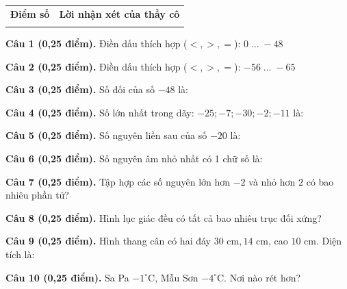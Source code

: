 \documentclass[12pt,a4paper]{article}
\begin{document}
\vspace{1.0mm}

\noindent
\begin{tabularx}{\linewidth}{|p{3.2cm}|X|}
\hline
\centering\textbf{Điểm số} & \centering\textbf{Lời nhận xét của thầy cô} \tabularnewline
\rule{0pt}{1.8cm} & \\
\hline
\end{tabularx}

\vspace{1.0mm}

\noindent\textbf{Câu 1 (0,25 điểm).} Điền dấu thích hợp ($<, >, =$): $0 \; \dots \; -48$ \shortans{$>$}\par\vspace{0.25mm}
\noindent\textbf{Câu 2 (0,25 điểm).} Điền dấu thích hợp ($<, >, =$): $-56 \; \dots \; -65$ \shortans{$>$}\par\vspace{0.25mm}
\noindent\textbf{Câu 3 (0,25 điểm).} Số đối của số $-48$ là: \par\vspace{0.25mm}
\noindent\textbf{Câu 4 (0,25 điểm).} Số lớn nhất trong dãy: $-25; -7; -30; -2; -11$ là: \par\vspace{0.25mm}
\noindent\textbf{Câu 5 (0,25 điểm).} Số nguyên liền sau của số $-20$ là: \par\vspace{0.25mm}
\noindent\textbf{Câu 6 (0,25 điểm).} Số nguyên âm nhỏ nhất có 1 chữ số là: \par\vspace{0.25mm}
\noindent\textbf{Câu 7 (0,25 điểm).} Tập hợp các số nguyên lớn hơn $-2$ và nhỏ hơn $2$ có bao nhiêu phần tử? \par\vspace{0.25mm}
\noindent\textbf{Câu 8 (0,25 điểm).} Hình lục giác đều có tất cả bao nhiêu trục đối xứng? \par\vspace{0.25mm}
\noindent\textbf{Câu 9 (0,25 điểm).} Hình thang cân có hai đáy $30\text{ cm}, 14\text{ cm}$, cao $10\text{ cm}$. Diện tích là: \par\vspace{0.25mm}
\noindent\textbf{Câu 10 (0,25 điểm).} Sa Pa $-1^\circ\text{C}$, Mẫu Sơn $-4^\circ\text{C}$. Nơi nào rét hơn? \par\vspace{0.25mm}
\end{document}
